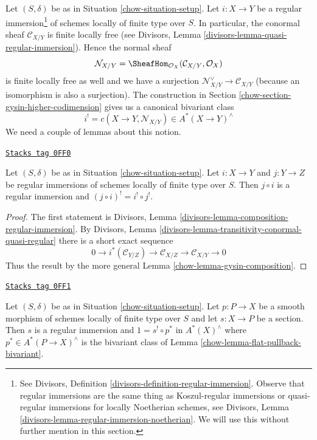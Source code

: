 \medskip\noindent
Let $(S, \delta)$ be as in Situation \ref{chow-situation-setup}.
Let $i : X \to Y$ be a
regular immersion\footnote{See
Divisors, Definition \ref{divisors-definition-regular-immersion}.
Observe that regular immersions are the same thing as
Koszul-regular immersions or quasi-regular immersions
for locally Noetherian schemes, see
Divisors, Lemma \ref{divisors-lemma-regular-immersion-noetherian}.
We will use this without further mention in this section.}
of schemes locally of finite type over $S$.
In particular, the conormal sheaf $\mathcal{C}_{X/Y}$ is finite locally free
(see Divisors, Lemma \ref{divisors-lemma-quasi-regular-immersion}). Hence the
normal sheaf
$$
\mathcal{N}_{X/Y} = \SheafHom_{\mathcal{O}_X}(\mathcal{C}_{X/Y}, \mathcal{O}_X)
$$
is finite locally free as well and we have a surjection
$\mathcal{N}_{X/Y}^\vee \to \mathcal{C}_{X/Y}$ (because an isomorphism
is also a surjection).
The construction in Section \ref{chow-section-gysin-higher-codimension}
gives us a canonical bivariant class
$$
i^! = c(X \to Y, \mathcal{N}_{X/Y}) \in A^*(X \to Y)^\wedge
$$
We need a couple of lemmas about this notion.

\begin{lemma}
\label{chow-lemma-composition-regular-immersion}
\href{https://stacks.math.columbia.edu/tag/0FF0}{\texttt{Stacks tag 0FF0}}

Let $(S, \delta)$ be as in Situation \ref{chow-situation-setup}.
Let $i : X \to Y$ and $j : Y \to Z$ be regular immersions
of schemes locally of finite type over $S$. Then
$j \circ i$ is a regular immersion and
$(j \circ i)^! = i^! \circ j^!$.
\end{lemma}

\begin{proof}

The first statement is
Divisors, Lemma \ref{divisors-lemma-composition-regular-immersion}.
By Divisors, Lemma \ref{divisors-lemma-transitivity-conormal-quasi-regular}
there is a short exact sequence
$$
0 \to
i^*(\mathcal{C}_{Y/Z}) \to
\mathcal{C}_{X/Z} \to
\mathcal{C}_{X/Y} \to 0
$$
Thus the result by the more general Lemma \ref{chow-lemma-gysin-composition}.
\end{proof}

\begin{lemma}
\label{chow-lemma-section-smooth}
\href{https://stacks.math.columbia.edu/tag/0FF1}{\texttt{Stacks tag 0FF1}}

Let $(S, \delta)$ be as in Situation \ref{chow-situation-setup}.
Let $p : P \to X$ be a smooth morphism of schemes locally of finite type
over $S$ and let $s : X \to P$ be a section. Then $s$ is a
regular immersion and $1 = s^! \circ p^*$ in $A^*(X)^\wedge$
where $p^* \in A^*(P \to X)^\wedge$ is the bivariant class
of Lemma \ref{chow-lemma-flat-pullback-bivariant}.
\end{lemma}

